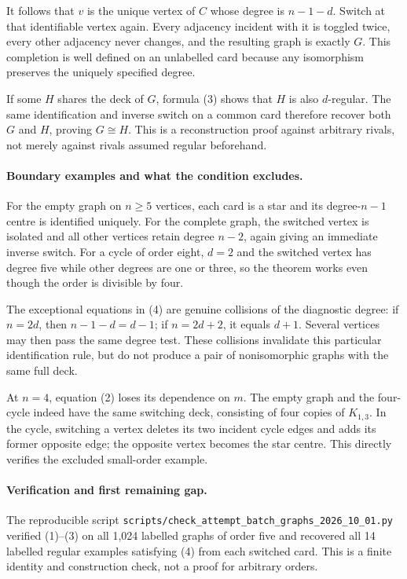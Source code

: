 \documentclass[11pt,a4paper]{article}
\begin{document}
It follows that $v$ is the unique vertex of $C$ whose degree is $n-1-d$. Switch at that identifiable vertex again. Every adjacency incident with it is toggled twice, every other adjacency never changes, and the resulting graph is exactly $G$. This completion is well defined on an unlabelled card because any isomorphism preserves the uniquely specified degree.

If some $H$ shares the deck of $G$, formula (3) shows that $H$ is also $d$-regular. The same identification and inverse switch on a common card therefore recover both $G$ and $H$, proving $G\cong H$. This is a reconstruction proof against arbitrary rivals, not merely against rivals assumed regular beforehand.

\paragraph{Boundary examples and what the condition excludes.}
For the empty graph on $n\ge5$ vertices, each card is a star and its degree-$n-1$ centre is identified uniquely. For the complete graph, the switched vertex is isolated and all other vertices retain degree $n-2$, again giving an immediate inverse switch. For a cycle of order eight, $d=2$ and the switched vertex has degree five while other degrees are one or three, so the theorem works even though the order is divisible by four.

The exceptional equations in (4) are genuine collisions of the diagnostic degree: if $n=2d$, then $n-1-d=d-1$; if $n=2d+2$, it equals $d+1$. Several vertices may then pass the same degree test. These collisions invalidate this particular identification rule, but do not produce a pair of nonisomorphic graphs with the same full deck.

At $n=4$, equation (2) loses its dependence on $m$. The empty graph and the four-cycle indeed have the same switching deck, consisting of four copies of $K_{1,3}$. In the cycle, switching a vertex deletes its two incident cycle edges and adds its former opposite edge; the opposite vertex becomes the star centre. This directly verifies the excluded small-order example.

\paragraph{Verification and first remaining gap.}
The reproducible script \texttt{scripts/check\_attempt\_batch\_graphs\_2026\_10\_01.py} verified (1)--(3) on all 1,024 labelled graphs of order five and recovered all 14 labelled regular examples satisfying (4) from each switched card. This is a finite identity and construction check, not a proof for arbitrary orders.
\end{document}

